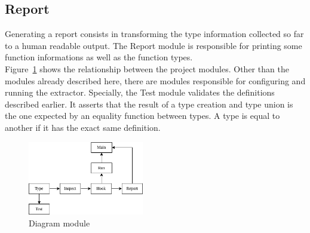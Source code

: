 \subsection*{Report}
Generating a report consists in transforming the type information collected so far to a human readable output. The Report module is responsible for printing some function informations as well as the function types.
\\

Figure~\ref{fig:diag} shows the relationship between the project modules. Other than the modules already described here, there are modules responsible for configuring and running the extractor. Specially, the Test module validates the definitions described earlier. It asserts that the result of a type creation and type union is the one expected by an equality function between types. A type is equal to another if it has the exact same definition.

\begin{figure}
\centering
\includegraphics[width=0.45\textwidth]{pictures/module_diagram.png}
\caption{Diagram module}
\label{fig:diag}
\end{figure}










